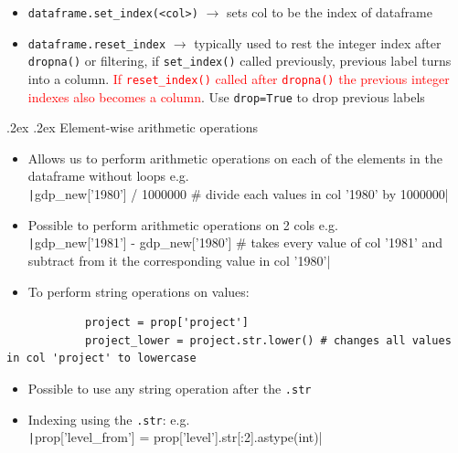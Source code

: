 \documentclass[10pt,landscape,a4paper]{article}
\makeatletter
\renewcommand{\section}{\@startsection{section}{1}{0mm}%
	{.2ex}%
	{.2ex}%
	{\color{myblue}\sffamily\small\bfseries}}
\renewcommand{\subsection}{\@startsection{subsection}{1}{0mm}%
	{.2ex}%
	{.2ex}%
	{\sffamily\bfseries}}
\renewcommand{\subsubsection}{\@startsection{subsubsection}{1}{0mm}%
	{.2ex}%
	{.2ex}%
	{\rmfamily\bfseries}}
\makeatother
\begin{document}
\begin{multicols*}{4}
\begin{itemize}
			\item \texttt{dataframe.set\_index(<col>)} $\rightarrow$ sets col to be the index of dataframe
			\item \texttt{dataframe.reset\_index} $\rightarrow$ typically used to rest the integer index after \texttt{dropna()} or filtering, if \texttt{set\_index()} called previously, previous label turns into a column. \textcolor{red}{If \texttt{reset\_index()} called after \texttt{dropna()} the previous integer indexes also becomes a column}. Use \texttt{drop=True} to drop previous labels
		\end{itemize}
		\subsubsection{Element-wise arithmetic operations}
		\begin{itemize}
			\item Allows us to perform arithmetic operations on each of the elements in the dataframe without loops e.g.\\ \texttt|gdp_new['1980'] / 1000000 # divide each values in col '1980' by 1000000|
			\item Possible to perform arithmetic operations on 2 cols e.g.\\ \texttt|gdp_new['1981'] - gdp_new['1980'] # takes every value of col '1981' and subtract from it the corresponding value in col '1980'|
			\item To perform string operations on values:
		\end{itemize}
		\begin{verbatim}
			project = prop['project']
			project_lower = project.str.lower() # changes all values in col 'project' to lowercase
		\end{verbatim}
		\begin{itemize}
			\item Possible to use any string operation after the \texttt{.str}
			\item Indexing using the \texttt{.str}: e.g.\\ \texttt|prop['level_from'] = prop['level'].str[:2].astype(int)|
		\end{itemize}

\end{multicols*}
\end{document}
